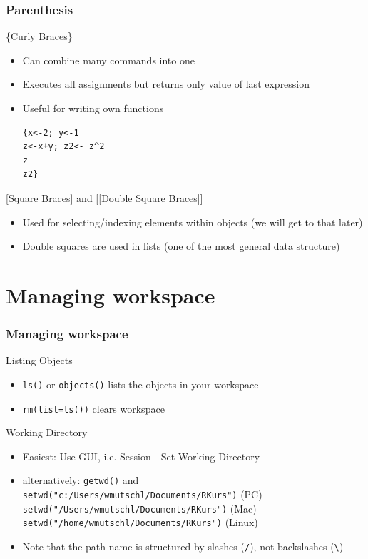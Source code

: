 \documentclass[xcolor={svgnames},10pt,
handout
]{beamer}
\begin{document}
\begin{frame}[fragile]\frametitle{Parenthesis}
\{Curly Braces\}
\begin{itemize}
\item Can combine many commands into one
\item Executes all assignments but returns only value of last expression
\item Useful for writing own functions
\begin{lstlisting}
{x<-2; y<-1
z<-x+y; z2<- z^2
z
z2}
\end{lstlisting}
\end{itemize}
[Square Braces] and [[Double Square Braces]]
\begin{itemize}
\item Used for selecting/indexing elements within objects (we will get to that later)
\item Double squares are used in lists (one of the most general data structure)
\end{itemize}
\end{frame}
\section{Managing workspace}



\begin{frame}[fragile]
\frametitle{Managing workspace}
Listing Objects
\begin{itemize}
\item \lstinline|ls()| or \lstinline|objects()| lists the objects in your workspace
\item \lstinline|rm(list=ls())| clears workspace
\end{itemize}
Working Directory
\begin{itemize}
	\item Easiest: Use GUI, i.e. Session - Set Working Directory
	\item alternatively: \lstinline|getwd()| and \\\lstinline|setwd("c:/Users/wmutschl/Documents/RKurs")| (PC)\\ \lstinline|setwd("/Users/wmutschl/Documents/RKurs")| (Mac)\\ \lstinline|setwd("/home/wmutschl/Documents/RKurs")| (Linux)
	\item Note that the path name is structured by slashes (\lstinline|/|), not backslashes (\lstinline|\|)
\end{itemize}
\end{frame}
\end{document}
